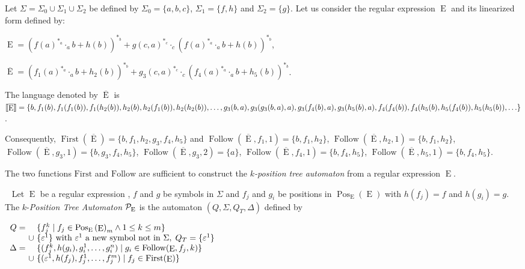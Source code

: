 \documentclass{llncs}
\DeclareMathOperator{\Pos}{Pos}
\DeclareMathOperator{\First}{First}
\DeclareMathOperator{\Follow}{Follow}
\DeclareMathOperator{\E}{E}
\def\b#1{\overline{#1}}
\def\Po#1#2{\Pos_{#1}{(#2)}}
\begin{document}
 \begin{example}\label{Pos Automat}
 Let $\Sigma=\Sigma_0\cup\Sigma_1\cup\Sigma_2$ be defined by $\Sigma_0=\{a,b,c\}$, $\Sigma_1=\{f,h\}$ and $\Sigma_2=\{g\}$.
    Let us consider the regular expression   $\E$ and its linearized form defined by:
   
    
\noindent$\E=(f(a)^{*_a}\cdot_a b+ h(b))^{*_b}+g(c,a)^{*_c}\cdot_c (f(a)^{*_a}\cdot_a b+ h(b))^{*_b}$,
   
    
\noindent$\b\E=(f_1(a)^{*_a}\cdot_a b+ h_2(b))^{*_b}+g_3(c,a)^{*_c}\cdot_c (f_4(a)^{*_a}\cdot_a b+ h_5(b))^{*_b}$.
      
The language denoted by $\b\E$ is $\llbracket \b\E\rrbracket=\{b, f_1(b),f_1(f_1(b)),f_1(h_2(b)),h_2(b),\\
h_2(f_1(b)),h_2(h_2(b)), \ldots,g_3(b,a), g_3(g_3(b,a),a),g_3(f_4(b),a),g_3(h_5(b),a) ,f_4(f_4(b)),\\ f_4(h_5(b),h_5(f_4(b)),h_5(h_5(b)),\ldots\}$.

Consequently, $\First(\b\E)=\{b,f_1,h_2,g_3,f_4,h_5\}$ and $\Follow(\b\E,f_1,1)=\{b,f_1,h_2\}$, $\Follow(\b\E,h_2,1)=\{b,f_1,h_2\}$, $\Follow(\b\E,g_3,1)=\{b,g_3,f_4,h_5\}$, $\Follow(\b\E,g_3,2)=\{a\}$, $\Follow(\b\E,f_4,1)=\{b,f_4,h_5\}$,  $\Follow(\b\E,h_5,1)=\{b,f_4,h_5\}$. 
\end{example}  
 

The two functions $\mathrm{First}$ and $\mathrm{Follow}$ are sufficient to construct the \emph{$k$-position tree automaton} from a regular expression  $\E$. 
 
  \begin{definition}\label{def aut pos}~\cite{arxiv}
    Let $\E$ be a regular expression , $f$ and $g$ be symbols in $\Sigma$ and $f_j$ and $g_i$ be positions in $\Po{\E}{\E}$ with $h(f_j)=f$ and $h(g_i)=g$. The $k$-\emph{Position Tree Automaton} ${\cal P_{\E}}$ is the automaton $(Q,\Sigma,Q_T,\Delta)$ defined by 
       
\centerline{$\begin{array}{r@{\ }c@{\ }l}
      Q=  & & \{f^k_j \mid f_j\in \Po{\E}{\E}_{m}\wedge 1\leq k\leq m\}\\
      & \cup & \{\varepsilon^1\}\mbox{ with } \varepsilon^1 \mbox{ a new symbol not in } \Sigma,\; Q_T=\{\varepsilon^1\}\\ 
\Delta = & & \{(f^k_j,h(g_i),g^1_i,\ldots,g^n_i)\mid g_i \in \Follow(\E,f_j,k)\} \\
            & \cup &  \{(\varepsilon^1,h(f_j),f^1_j,\ldots,f^m_j)\mid f_j \in\First(\E)\}\\
\end{array}$}       
       
      
  \end{definition}
  
\end{document}

